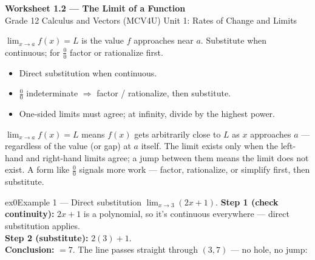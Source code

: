 \documentclass[11pt]{article}
\begin{document}
\begin{center}
{\LARGE\bfseries\color{titleblue}Worksheet 1.2 --- The Limit of a Function}\\[2pt]
{\small Grade 12 Calculus and Vectors (MCV4U) \textperiodcentered{} Unit 1: Rates of Change and Limits}
\end{center}

\begin{ideabox}
$\displaystyle\lim_{x\to a}f(x)=L$ is the value $f$ approaches near $a$. Substitute when continuous; for $\tfrac00$ factor or rationalize first.
\begin{itemize}[leftmargin=*,itemsep=2pt]
  \item Direct substitution when continuous.
  \item $\tfrac00$ indeterminate $\Rightarrow$ factor / rationalize, then substitute.
  \item One-sided limits must agree; at infinity, divide by the highest power.
\end{itemize}
\end{ideabox}

\begin{learnbox}
$\displaystyle\lim_{x\to a}f(x)=L$ means $f(x)$ gets arbitrarily close to $L$ as $x$ approaches $a$ — regardless of the value (or gap) at $a$ itself.
The limit exists only when the left-hand and right-hand limits agree; a jump between them means the limit does not exist.
A form like $\tfrac00$ signals more work — factor, rationalize, or simplify first, then substitute.
\end{learnbox}


\begin{example}{ex0}{Example 1 --- Direct substitution}
$\displaystyle\lim_{x\to3}(2x+1)$.\soln
\textbf{Step 1 (check continuity):} $2x+1$ is a polynomial, so it's continuous everywhere --- direct substitution applies.\\[3pt]
\textbf{Step 2 (substitute):} $2(3)+1$.\\[3pt]
\textbf{Conclusion:} $=7$. The line passes straight through $(3,7)$ --- no hole, no jump:
\end{example}
\end{document}

